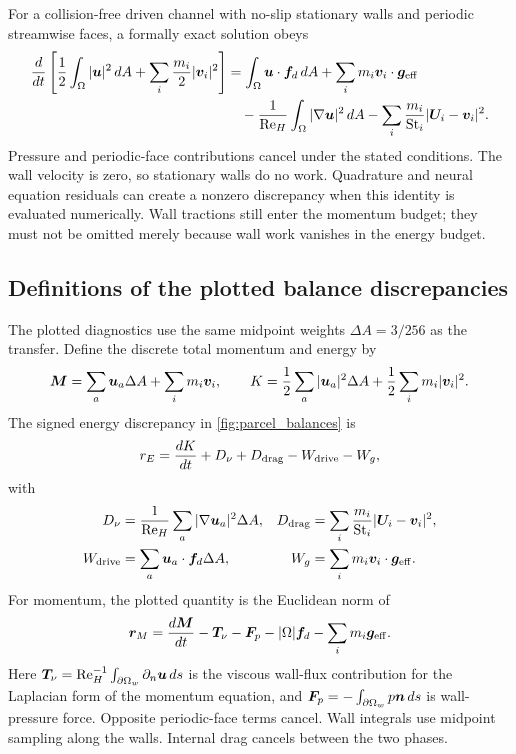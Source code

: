 For a collision-free driven channel with no-slip stationary walls and
periodic streamwise faces, a formally exact solution obeys
\begin{equation}
 \begin{aligned}
 \frac{d}{dt}\left[\frac{1}{2}\int_\Omega|\bm{u}|^2\,dA
 +\sum_i\frac{m_i}{2}|\bm{v}_i|^2\right]
 &=\int_\Omega\bm{u}\cdot\bm{f}_d\,dA
 +\sum_i m_i\bm{v}_i\cdot\bm{g}_{\mathrm{eff}}\\
 &\quad-\frac{1}{\mathrm{Re}_H}\int_\Omega|\nabla\bm{u}|^2\,dA
 -\sum_i\frac{m_i}{\mathrm{St}_i}|\bm{U}_i-\bm{v}_i|^2.
 \end{aligned}
 \label{eq:energy_budget}
\end{equation}
Pressure and periodic-face contributions cancel under the stated
conditions. The wall velocity is zero, so stationary walls do no work.
Quadrature and neural equation residuals can create a nonzero discrepancy
when this identity is evaluated numerically. Wall tractions still enter
the momentum budget; they must not be omitted merely because wall work
vanishes in the energy budget.

\subsection{Definitions of the plotted balance discrepancies}
The plotted diagnostics use the same midpoint weights $\Delta A=3/256$
as the transfer. Define the discrete total momentum and energy by
\begin{equation}
 \bm{M}=\sum_a\bm{u}_a\Delta A+\sum_i m_i\bm{v}_i,\qquad
 K=\frac12\sum_a|\bm{u}_a|^2\Delta A
       +\frac12\sum_i m_i|\bm{v}_i|^2.
\end{equation}
The signed energy discrepancy in \cref{fig:parcel_balances} is
\begin{equation}
 r_E=\frac{dK}{dt}+D_\nu+D_{\rm drag}
             -W_{\rm drive}-W_g,
 \label{eq:energy_discrepancy}
\end{equation}
with
\begin{align}
 D_\nu&=\frac{1}{\mathrm{Re}_H}\sum_a
              |\nabla\bm{u}_a|^2\Delta A,&
 D_{\rm drag}&=\sum_i\frac{m_i}{\mathrm{St}_i}|\bm{U}_i-\bm{v}_i|^2,\\
 W_{\rm drive}&=\sum_a\bm{u}_a\cdot\bm{f}_d\Delta A,&
 W_g&=\sum_i m_i\bm{v}_i\cdot\bm{g}_{\rm eff}.
\end{align}
For momentum, the plotted quantity is the Euclidean norm of
\begin{equation}
 \bm{r}_M=\frac{d\bm{M}}{dt}-\bm{T}_\nu-\bm{F}_p
                -|\Omega|\bm{f}_d-\sum_i m_i\bm{g}_{\rm eff}.
 \label{eq:momentum_discrepancy}
\end{equation}
Here $\bm{T}_\nu=\mathrm{Re}_H^{-1}\int_{\partial\Omega_w}
\partial_n\bm{u}\,ds$ is the viscous wall-flux contribution for the
Laplacian form of the momentum equation, and
$\bm{F}_p=-\int_{\partial\Omega_w}p\bm{n}\,ds$ is wall-pressure
force. Opposite periodic-face terms cancel. Wall integrals use midpoint
sampling along the walls. Internal drag cancels between the two phases.

